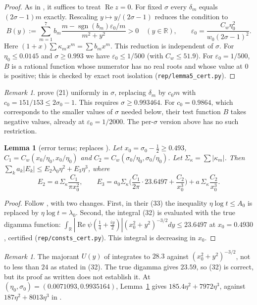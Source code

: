 \documentclass[11pt]{amsart}
\numberwithin{equation}{section}
\newtheorem{lemma}[theorem]{Lemma}
\theoremstyle{definition}
\theoremstyle{remark}
\newtheorem{remark}[theorem]{Remark}
\newcommand{\Rp}{\operatorname{Re}}
\newcommand{\eps}{\varepsilon}
\newcommand{\code}[1]{\texttt{#1}}
\DeclareMathOperator{\sgn}{sgn}
\begin{document}
\begin{proof}
As in \cite{BTY}, it suffices to treat $\Rp z = 0$.
For fixed $\sigma$ every $\delta_m$ equals $(2\sigma-1)m$ exactly.
Rescaling $y \mapsto y/(2\sigma-1)$ reduces the condition to
\[
B(y) := \sum_{m=1}^{7} b_m\frac{m - \sgn(b_m)\eps_0/m}{m^2+y^2} > 0 \quad (y\in\mathbb R), \qquad \eps_0 = \frac{C_w\eta_0^2}{w_0(2\sigma-1)^2}.
\]
Here $(1+x)\sum\kappa_mx^m = \sum b_mx^m$.
This reduction is independent of $\sigma$.
For $\eta_0 \le 0.0145$ and $\sigma \ge 0.993$ we have $\eps_0 \le 1/500$ (with $C_w \le 51.9$).
For $\eps_0 = 1/500$, $B$ is a rational function whose numerator has no real roots and whose value at $0$ is positive; this is checked by exact root isolation (\code{rep/lemma5\_cert.py}).
\end{proof}

\begin{remark}\label{rem:L5}
\cite{BTY} prove (21) uniformly in $\sigma$, replacing $\delta_m$ by $c_0m$ with $c_0 = 151/153 \le 2\sigma_0-1$.
This requires $\sigma \ge 0.993464$.
For $c_0 = 0.9864$, which corresponds to the smaller values of $\sigma$ needed below, their test function $B$ takes negative values, already at $\eps_0 = 1/2000$.
The per-$\sigma$ version above has no such restriction.
\end{remark}

\begin{lemma}[error terms; replaces {\cite[Lemmas~8, 9 and (48)]{BTY}}]\label{lem:L89}
Let $x_0 = \sigma_0 - \frac12 \ge 0.493$, $C_1 = C_w(x_0/\eta_0, x_0/\eta_0)$ and $C_2 = C_w(\sigma_0/\eta_0,\sigma_0/\eta_0)$.
Let $\Sigma_\kappa = \sum|\kappa_m|$. Then $\sum_k a_k|E_k| \le E_2\lambda_0\eta^2 + E_3\eta^3$, where
\[
E_2 = a\,\Sigma_\kappa\frac{C_1}{\pi x_0^2}, \qquad
E_3 = a_0\Sigma_\kappa\Big(\frac{C_1}{2\pi}\cdot 23.6497 + \frac{C_2}{x_0^3}\Big) + a\,\Sigma_\kappa\frac{C_2}{x_0^3} .
\]
\end{lemma}

\begin{proof}
Follow \cite[Lemma~8]{BTY}, with two changes.
First, in their (33) the inequality $\eta\log t \le A_0$ is replaced by $\eta\log t = \lambda_0$.
Second, the integral (32) is evaluated with the true digamma function:
$\int_{\mathbb R}|\Rp\psi(\frac14 + \frac{iy}2)|(x_0^2+y^2)^{-3/2}dy \le 23.6497$ at $x_0 = 0.4930$, certified (\code{rep/consts\_cert.py}).
This integral is decreasing in $x_0$.
\end{proof}

\begin{remark}
The majorant $U(y)$ of \cite[(31)]{BTY} integrates to $28.3$ against $(x_0^2+y^2)^{-3/2}$, not to less than $24$ as stated in (32).
The true digamma gives $23.59$, so (32) is correct, but its proof as written does not establish it.
At $(\eta_0,\sigma_0) = (0.0071093, 0.9935164)$, Lemma~\ref{lem:L89} gives $185.4\eta^2 + 7972\eta^3$, against $187\eta^2 + 8013\eta^3$ in \cite[(48)]{BTY}.
\end{remark}
\end{document}
